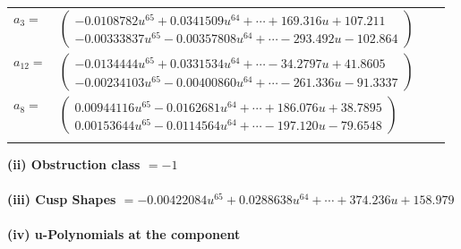 \documentclass[1p]{elsarticle_modified}
\theoremstyle{definition}
\begin{document}
\begin{tabular}{m{7pt} m{180pt} m{7pt} m{180pt} }
\flushright $a_{3}=$&$\begin{pmatrix}-0.0108782 u^{65}+0.0341509 u^{64}+\cdots+169.316 u+107.211\\-0.00333837 u^{65}-0.00357808 u^{64}+\cdots-293.492 u-102.864\end{pmatrix}$ \\
\flushright $a_{12}=$&$\begin{pmatrix}-0.0134444 u^{65}+0.0331534 u^{64}+\cdots-34.2797 u+41.8605\\-0.00234103 u^{65}-0.00400860 u^{64}+\cdots-261.336 u-91.3337\end{pmatrix}$ \\
\flushright $a_{8}=$&$\begin{pmatrix}0.00944116 u^{65}-0.0162681 u^{64}+\cdots+186.076 u+38.7895\\0.00153644 u^{65}-0.0114564 u^{64}+\cdots-197.120 u-79.6548\end{pmatrix}$\\&\end{tabular}
\flushleft \textbf{(ii) Obstruction class $= -1$}\\~\\
\flushleft \textbf{(iii) Cusp Shapes $= -0.00422084 u^{65}+0.0288638 u^{64}+\cdots+374.236 u+158.979$}\\~\\
\newpage\renewcommand{\arraystretch}{1}
\flushleft \textbf{(iv) u-Polynomials at the component}\newline \\
\end{document}
